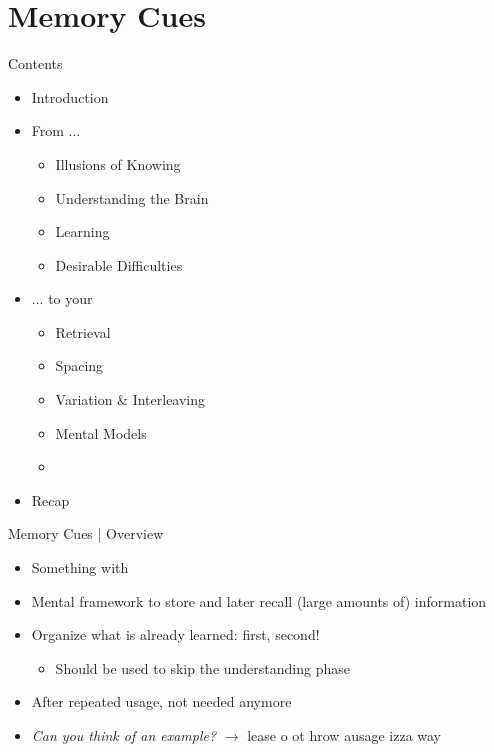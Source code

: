 \documentclass{ercisbeamer}
\begin{document}
\section{Memory Cues}
\begin{frame}{Contents}
    \begin{itemize}
        \item Introduction
        \item From ...
        \begin{itemize}
            \item Illusions of Knowing
            \item Understanding the Brain
            \item Learning
            \item Desirable Difficulties
        \end{itemize}
        \item ... to your 
        \begin{itemize}
            \item Retrieval
            \item Spacing
            \item Variation \& Interleaving
            \item Mental Models
            \item {}
        \end{itemize}
        \item Recap
    \end{itemize}
\end{frame}

\begin{frame}{Memory Cues | Overview}
    \begin{tbox}
        \begin{itemize}
            \item Something with 
            \item Mental framework to store and later recall (large amounts of) information
            \item Organize what is already learned:  first,  second!
            \begin{itemize}
                \item Should  be used to skip the understanding phase
            \end{itemize} 
            \item After repeated usage, not needed anymore
            \item \emph{Can you think of an example?} \pause
            $\rightarrow$ lease o ot hrow ausage izza way 
        \end{itemize}
    \end{tbox}
\end{frame}
\setbgimage{}
\end{document}
